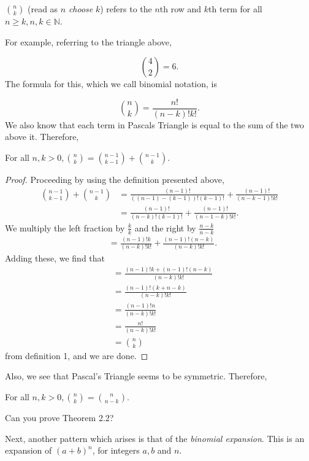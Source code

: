\documentclass[11pt]{article}
\begin{document}
\begin{defn}
	$\binom{n}{k}$ (read as $n$ \textit{choose} $k$) refers to the $n$th row and $k$th term for all $n \geq k, n,k \in \mathbb{N}$.
\end{defn}
For example, referring to the triangle above,

\[\binom{4}{2} = 6.\]
The formula for this, which we call binomial notation, is

\[\binom{n}{k}=\frac{n!}{(n-k)!k!}.\]
We also know that each term in Pascals Triangle is equal to the sum of the two above it. Therefore,

\begin{thrm}
	For all $n,k > 0, \binom{n}{k} = \binom{n-1}{k-1} + \binom{n-1}{k}$.
\end{thrm}
\begin{proof}
	Proceeding by using the definition presented above,
	\begin{align*}
		\binom{n-1}{k-1} + \binom{n-1}{k} &= \frac{(n-1)!}{((n-1) - (k-1))!(k-1)!} + \frac{(n-1)!}{(n - k - 1)!k!} \\
		&= \frac{(n-1)!}{(n - k)!(k-1)!} + \frac{(n-1)!}{(n - 1 - k)!k!}.
	\end{align*}
	We multiply the left fraction by $\frac{k}{k}$ and the right by $\frac{n-k}{n-k}$
	\begin{align*}
		&= \frac{(n-1)!k}{(n - k)!k!} + \frac{(n-1)!(n-k)}{(n - k)!k!}.
	\end{align*}
	Adding these, we find that
	\begin{align*}
		&= \frac{(n-1)!k+(n-1)!(n-k)}{(n-k)!k!} \\
		&= \frac{(n-1)!(k+n-k)}{(n-k)!k!} \\
		&= \frac{(n-1)!n}{(n-k)!k!} \\
		&= \frac{n!}{(n-k)!k!} \\
		&= \binom{n}{k}
	\end{align*}
	from definition 1, and we are done.
\end{proof}

\noindent Also, we see that Pascal's Triangle seems to be symmetric. Therefore,

\begin{thrm}
	For all $n,k > 0, \binom{n}{k} = \binom{n}{n-k}.$
\end{thrm}
\begin{question}
    Can you prove Theorem 2.2?
\end{question}
Next, another pattern which arises is that of the \textit{binomial expansion}. This is an expansion of $(a+b)^n$, for integers $a, b$ and $n$.
\end{document}
